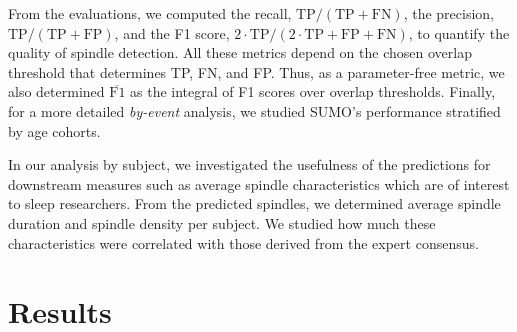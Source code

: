 \documentclass[fleqn,twocolumn,10pt]{wlscirep}
\newcommand{\Fmean}{$\overline{\text{F1}}$}
\begin{document}
From the evaluations, we computed the recall,
$\text{TP}/(\text{TP}+\text{FN})$, the precision,
$\text{TP}/(\text{TP}+\text{FP})$, and the F1 score,
$2\cdot\text{TP}/(2\cdot\text{TP}+\text{FP}+\text{FN})$, to quantify the
quality of spindle detection.
All these metrics depend on the chosen overlap threshold that determines TP, FN,
and FP. Thus, as a parameter-free metric, we also determined \Fmean{} as the
integral of F1 scores over overlap thresholds.
Finally, for a more detailed \emph{by-event} analysis, we studied SUMO's performance stratified by age cohorts.

In our analysis by subject, we investigated the usefulness of the predictions
for downstream measures such as average spindle characteristics which are of
interest to sleep researchers. From the predicted spindles, we determined
average spindle duration and spindle density per subject. We studied how
much these characteristics were correlated with those derived from the expert
consensus.
 
\section{Results}
\label{sec:results}
\end{document}
